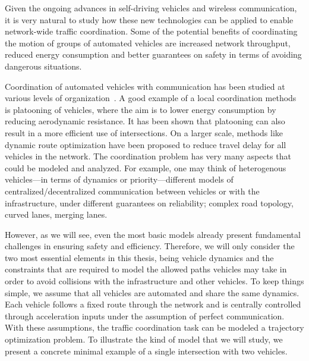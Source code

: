 \documentclass[a4paper]{report}
\theoremstyle{definition}
\theoremstyle{plain}
\begin{document}

Given the ongoing advances in self-driving vehicles and wireless communication,
it is very natural to study how these new technologies can be applied to enable
network-wide traffic coordination.
%
Some of the potential benefits of coordinating the motion of groups of automated
vehicles are increased network throughput, reduced energy consumption and better
guarantees on safety in terms of avoiding dangerous situations.

Coordination of automated vehicles with communication has been studied at
various levels of organization~\cite{marianiCoordinationAutonomousVehicles2022}.
A good example of a local coordination methods is platooning of vehicles, where
the aim is to lower energy consumption by reducing aerodynamic resistance. It
has been shown that platooning can also result in a more efficient use of
intersections. On a larger scale, methods like dynamic route optimization have
been proposed to reduce travel delay for all vehicles in the network.
%
The coordination problem has very many aspects that could be modeled and
analyzed. For example, one may think of heterogenous vehicles---in terms of
dynamics or priority---different models of centralized/decentralized
communication between vehicles or with the infrastructure, under different
guarantees on reliability; complex road topology, curved lanes, merging lanes.

However, as we will see, even the most basic models already present fundamental
challenges in ensuring safety and efficiency.
%
Therefore, we will only consider the two most essential elements in this thesis,
being vehicle dynamics and the constraints that are required to model the
allowed paths vehicles may take in order to avoid collisions with the
infrastructure and other vehicles.
%
To keep things simple, we assume that all vehicles are automated and share the
same dynamics.
%
Each vehicle follows a fixed route through the network and is centrally
controlled through acceleration inputs under the assumption of perfect
communication.
%
With these assumptions, the traffic coordination task can be modeled a
trajectory optimization problem.
%
To illustrate the kind of model that we will study, we present a concrete
minimal example of a single intersection with two vehicles.
\end{document}
